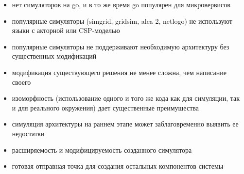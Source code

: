 \begin{itemize}
	\item нет симуляторов на go, и в то же время go популярен для микровервисов
	\item популярные симуляторы (simgrid, gridsim, alea 2, netlogo) не используют языки с акторной или CSP-моделью
	\item популярные симуляторы не поддерживают необходимую архитектуру без существенных модификаций
	\item модификация существующего решения не менее сложна, чем написание своего
	\item изоморфность (использование одного и того же кода как для симуляции, так и для реального окружения) дает существенные преимущества
	\item симуляция архитектуры на раннем этапе может заблаговременно выявить ее недостатки
	\item расширяемость и модифицируемость созданного симулятора
	\item готовая отправная точка для создания остальных компонентов системы
\end{itemize}
